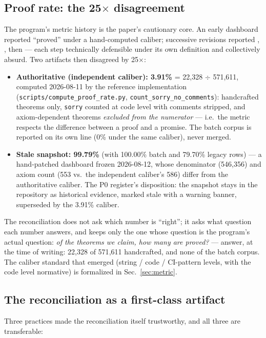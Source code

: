 \subsection{Proof rate: the 25$\times$ disagreement}
\label{sec:history}
The program's metric history is the paper's cautionary core. An
early dashboard reported  ``proved'' under a
hand-computed caliber; successive revisions reported ,
, then  --- each step technically defensible
under its own definition and collectively absurd. Two artifacts
then disagreed by 25$\times$:

\begin{itemize}
\item \textbf{Authoritative (independent caliber): 3.91\%} =
22{,}328 $\div$ 571{,}611, computed 2026-08-11 by the reference
implementation (\texttt{scripts/\allowbreak compute\_\allowbreak proof\_\allowbreak rate.py},
\texttt{count\_\allowbreak sorry\_\allowbreak no\_\allowbreak comments}): handcrafted theorems only,
\texttt{sorry} counted at code level with comments stripped, and
axiom-dependent theorems \emph{excluded from the numerator} ---
i.e.\ the metric respects the difference between a proof and a
promise. The batch corpus is reported on its own line (0\% under
the same caliber), never merged.
\item \textbf{Stale snapshot: 99.79\%} (with 100.00\% batch and
79.70\% legacy rows) --- a hand-patched dashboard frozen
2026-08-12, whose denominator (546{,}356) and axiom count (553 vs.\
the independent caliber's 586) differ from the authoritative
caliber. The P0 register's disposition: the snapshot stays in the
repository as historical evidence, marked stale with a warning
banner, superseded by the 3.91\% caliber.
\end{itemize}

The reconciliation does not ask which number is ``right''; it asks
what question each number answers, and keeps only the one whose
question is the program's actual question: \emph{of the theorems we
claim, how many are proved?} --- answer, at the time of writing:
22{,}328 of 571{,}611 handcrafted, and none of the batch corpus.
The caliber standard that emerged (string / code / CI-pattern
levels, with the code level normative) is formalized in
Sec.~\ref{sec:metric}.

\subsection{The reconciliation as a first-class artifact}
\label{sec:recon-artifact}
Three practices made the reconciliation itself trustworthy, and all
three are transferable:

